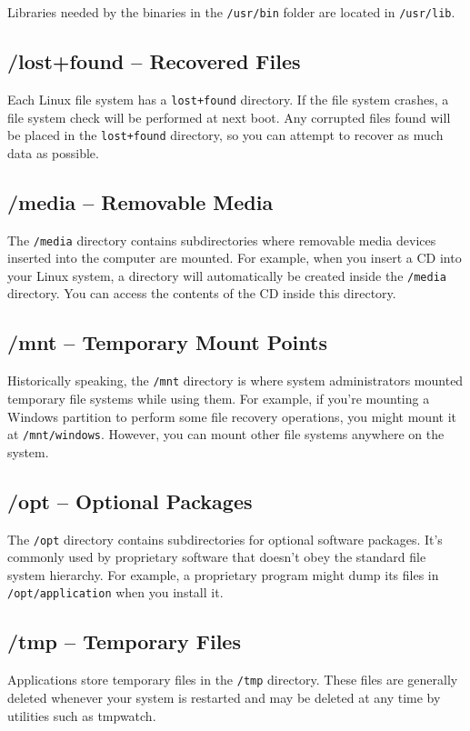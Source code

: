 \documentclass{article}
\newenvironment{blocktemplateII}[1]{%
    \tcolorbox[beamer,%
    noparskip,breakable,
    colframe=Green,%
    colbacklower=LimeGreen!75!LightGreen,%
    title=#1]}%
    {\endtcolorbox}
\begin{document}
\begin{blocktemplateII}{NOTE}
Libraries needed by the binaries in the \verb|/usr/bin| folder are located in \verb|/usr/lib|.
\end{blocktemplateII}

\subsection{/lost+found -- Recovered Files}
Each Linux file system has a \verb|lost+found| directory. If the file system crashes, a file system check will be performed at next boot. Any corrupted files found will be placed in the \verb|lost+found| directory, so you can attempt to recover as much data as possible.

\subsection{/media -- Removable Media}
The \verb|/media| directory contains subdirectories where removable media devices inserted into the computer are mounted. For example, when you insert a CD into your Linux system, a directory will automatically be created inside the \verb|/media| directory. You can access the contents of the CD inside this directory.

\subsection{/mnt -- Temporary Mount Points}
Historically speaking, the \verb|/mnt| directory is where system administrators mounted temporary file systems while using them. For example, if you're mounting a Windows partition to perform some file recovery operations, you might mount it at \verb|/mnt/windows|. However, you can mount other file systems anywhere on the system.

\subsection{/opt -- Optional Packages}
The \verb|/opt| directory contains subdirectories for optional software packages. It's commonly used by proprietary software that doesn't obey the standard file system hierarchy. For example, a proprietary program might dump its files in \verb|/opt/application| when you install it.

\subsection{/tmp -- Temporary Files}
Applications store temporary files in the \verb|/tmp| directory. These files are generally deleted whenever your system is restarted and may be deleted at any time by utilities such as tmpwatch.
\end{document}
